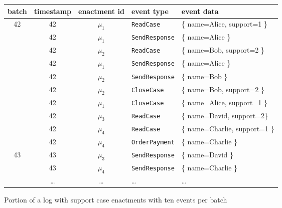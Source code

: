 \begin{figure}[h!]
  \centering
  \begin{footnotesize}
  \begin{tabular}{|c|c|c|l|l|}\hline
batch               & timestamp     & enactment id  & event type                    & event data                              \\\hline
\multirow{10}{*}{42} & 42             & $\mu_{1}$     & \texttt{ReadCase}            & \{ name=Alice, support=1 \}             \\\cline{2-5}
                    & 42             & $\mu_{1}$     &  \texttt{SendResponse}        & \{ name=Alice \}                        \\\cline{2-5}
                    & 42             & $\mu_{2}$     &  \texttt{ReadCase}            & \{ name=Bob, support=2 \}               \\\cline{2-5}
                    & 42             & $\mu_{1}$     &  \texttt{SendResponse}        & \{ name=Alice \}                        \\\cline{2-5}
                    & 42             & $\mu_{2}$     &  \texttt{SendResponse}        & \{ name=Bob \}                          \\\cline{2-5}
                    & 42             & $\mu_{2}$     &  \texttt{CloseCase}           & \{ name=Bob, support=2 \}               \\\cline{2-5}
                    & 42             & $\mu_{1}$     &  \texttt{CloseCase}           & \{ name=Alice, support=1 \}             \\\cline{2-5}
                    & 42             & $\mu_{3}$     &  \texttt{ReadCase}            & \{ name=David, support=2\}              \\\cline{2-5}
                    & 42             & $\mu_{4}$     &  \texttt{ReadCase}            & \{ name=Charlie, support=1 \}           \\\cline{2-5}
                    & 42             & $\mu_{4}$     &  \texttt{OrderPayment}        & \{ name=Charlie \}                      \\\cline{1-5}
\multirow{3}{*}{43}  & 43             & $\mu_{3}$     &  \texttt{SendResponse}        & \{ name=David \}                        \\\cline{2-5}
                    & 43             & $\mu_{4}$     &  \texttt{SendResponse}        & \{ name=Charlie \}                      \\\cline{2-5}
                    & \dots         & \dots         & \dots                         & \dots                                   \\\hline
    \end{tabular}
  \end{footnotesize}
  \caption{Portion of a log with {\sc support case} enactments with ten events per batch}
  \label{fig:log}
\end{figure}

